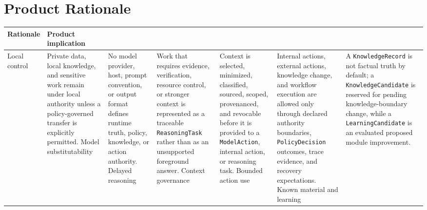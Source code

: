 \section{Product Rationale}
\begin{center}
	\madreLogoH
\end{center}
\begin{tabularx}{.95\linewidth}{@{}lX@{}}
	\toprule
	\textbf{Rationale} & \textbf{Product implication} \\
	\midrule
	Local control & Private data, local knowledge, and sensitive work remain under local authority unless a policy-governed transfer is explicitly permitted. \n
	Model substitutability & No model provider, host, prompt convention, or output format defines runtime truth, policy, knowledge, or action authority. \n
	Delayed reasoning & Work that requires evidence, verification, resource control, or stronger context is represented as a traceable \texttt{ReasoningTask} rather than as an unsupported foreground answer. \n
	Context governance & Context is selected, minimized, classified, sourced, scoped, provenanced, and revocable before it is provided to a \texttt{ModelAction}, internal action, or reasoning task. \n
	Bounded action use & Internal actions, external actions, knowledge change, and workflow execution are allowed only through declared authority boundaries, \texttt{PolicyDecision} outcomes, trace evidence, and recovery expectations. \n
	Known material and learning & A \texttt{KnowledgeRecord} is not factual truth by default; a \texttt{KnowledgeCandidate} is reserved for pending knowledge-boundary change, while a \texttt{LearningCandidate} is an evaluated proposed module improvement. \\
	\bottomrule
\end{tabularx}

